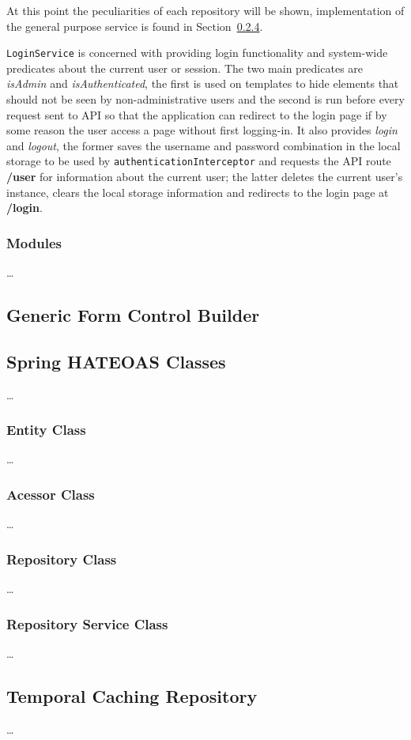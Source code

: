 At this point the peculiarities of each repository will be shown, implementation of the general purpose service is found in Section~\ref{hateoas:service}.

\texttt{LoginService} is concerned with providing login functionality and system-wide predicates about the current user or session. The two main predicates are \textit{isAdmin} and \textit{isAuthenticated}, the first is used on templates to hide elements that should not be seen by non-administrative users and the second is run before every request sent to \gls{API} so that the application can redirect to the login page if by some reason the user access a page without first logging-in. It also provides \textit{login} and \textit{logout}, the former saves the username and password combination in the local storage to be used by \texttt{authenticationInterceptor} and requests the \gls{API} route \textbf{/user} for information about the current user; the latter deletes the current user's instance, clears the local storage information and redirects to the login page at \textbf{/login}.

\subsubsection{Modules}
\dots
\subsection{Generic Form Control Builder}

\subsection{Spring HATEOAS Classes}
\dots
\subsubsection{Entity Class}
\dots
\subsubsection{Acessor Class}
\dots
\subsubsection{Repository Class}
\dots
\subsubsection{Repository Service Class}\label{hateoas:service}
\dots
\subsection{Temporal Caching Repository}
\dots
